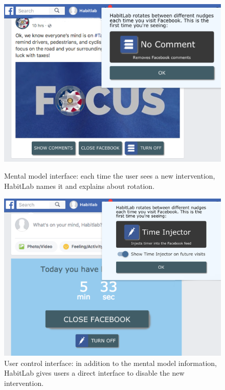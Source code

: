 \begin{figure}
\begin{minipage}[t]{0.49\linewidth}
\includegraphics[width=\linewidth]{figures/info_full_facebook_new}
\caption{Mental model interface: each time the user sees a new intervention, HabitLab names it and explains about rotation.}
  \label{fig:info}
\end{minipage}
\hfill
\begin{minipage}[t]{0.49\linewidth}
\includegraphics[width=\linewidth]{figures/power_full_facebook_new}
\caption{User control interface: in addition to the mental model information, HabitLab gives users a direct interface to disable the new intervention.}
  \label{fig:power}
\end{minipage}%
\end{figure}

